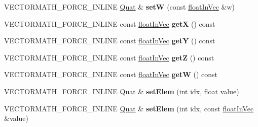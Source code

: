 \begin{DoxyCompactItemize}
\item 
\mbox{\label{classVectormath_1_1Aos_1_1Quat_a9caeb6e18a072b9e61cb23c23ebafd5b}} 
V\+E\+C\+T\+O\+R\+M\+A\+T\+H\+\_\+\+F\+O\+R\+C\+E\+\_\+\+I\+N\+L\+I\+NE \hyperlink{classVectormath_1_1Aos_1_1Quat}{Quat} \& {\bfseries setW} (const \hyperlink{classVectormath_1_1floatInVec}{float\+In\+Vec} \&w)
\item 
\mbox{\label{classVectormath_1_1Aos_1_1Quat_a231672b8da59c9c886cdb1ca60d9f8e0}} 
V\+E\+C\+T\+O\+R\+M\+A\+T\+H\+\_\+\+F\+O\+R\+C\+E\+\_\+\+I\+N\+L\+I\+NE const \hyperlink{classVectormath_1_1floatInVec}{float\+In\+Vec} {\bfseries getX} () const
\item 
\mbox{\label{classVectormath_1_1Aos_1_1Quat_a73ef4fc9f3aaf21e8c2a18314cac287f}} 
V\+E\+C\+T\+O\+R\+M\+A\+T\+H\+\_\+\+F\+O\+R\+C\+E\+\_\+\+I\+N\+L\+I\+NE const \hyperlink{classVectormath_1_1floatInVec}{float\+In\+Vec} {\bfseries getY} () const
\item 
\mbox{\label{classVectormath_1_1Aos_1_1Quat_a052078ed001599dc3edd55abc67f00f2}} 
V\+E\+C\+T\+O\+R\+M\+A\+T\+H\+\_\+\+F\+O\+R\+C\+E\+\_\+\+I\+N\+L\+I\+NE const \hyperlink{classVectormath_1_1floatInVec}{float\+In\+Vec} {\bfseries getZ} () const
\item 
\mbox{\label{classVectormath_1_1Aos_1_1Quat_a34193ea31d58f9e0c0dc48f7ad10f572}} 
V\+E\+C\+T\+O\+R\+M\+A\+T\+H\+\_\+\+F\+O\+R\+C\+E\+\_\+\+I\+N\+L\+I\+NE const \hyperlink{classVectormath_1_1floatInVec}{float\+In\+Vec} {\bfseries getW} () const
\item 
\mbox{\label{classVectormath_1_1Aos_1_1Quat_afd13fc9c366143b07fb28215bcf0ee64}} 
V\+E\+C\+T\+O\+R\+M\+A\+T\+H\+\_\+\+F\+O\+R\+C\+E\+\_\+\+I\+N\+L\+I\+NE \hyperlink{classVectormath_1_1Aos_1_1Quat}{Quat} \& {\bfseries set\+Elem} (int idx, float value)
\item 
\mbox{\label{classVectormath_1_1Aos_1_1Quat_a81430579c3ee01511de4265eda77d5ef}} 
V\+E\+C\+T\+O\+R\+M\+A\+T\+H\+\_\+\+F\+O\+R\+C\+E\+\_\+\+I\+N\+L\+I\+NE \hyperlink{classVectormath_1_1Aos_1_1Quat}{Quat} \& {\bfseries set\+Elem} (int idx, const \hyperlink{classVectormath_1_1floatInVec}{float\+In\+Vec} \&value)

\end{DoxyCompactItemize}
